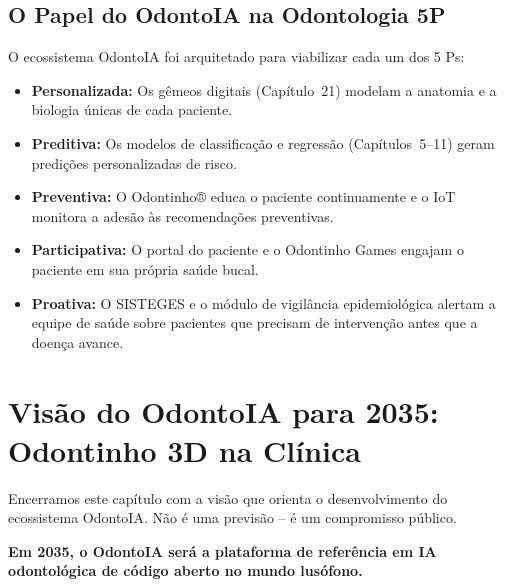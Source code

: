 \subsection{O Papel do OdontoIA na Odontologia 5P}

O ecossistema OdontoIA foi arquitetado para viabilizar cada um dos 5 Ps:

\begin{itemize}
  \item \textbf{Personalizada:} Os gêmeos digitais (Capítulo~21) modelam a
    anatomia e a biologia únicas de cada paciente.
  \item \textbf{Preditiva:} Os modelos de classificação e regressão
    (Capítulos~5--11) geram predições personalizadas de risco.
  \item \textbf{Preventiva:} O Odontinho® educa o paciente continuamente e o
    IoT monitora a adesão às recomendações preventivas.
  \item \textbf{Participativa:} O portal do paciente e o Odontinho Games
    engajam o paciente em sua própria saúde bucal.
  \item \textbf{Proativa:} O SISTEGES e o módulo de vigilância epidemiológica
    alertam a equipe de saúde sobre pacientes que precisam de intervenção antes
    que a doença avance.
\end{itemize}


\section{Visão do OdontoIA para 2035: Odontinho 3D na Clínica}
\label{sec:visao-2035}

\nivelzero

Encerramos este capítulo com a visão que orienta o desenvolvimento do
ecossistema OdontoIA. Não é uma previsão -- é um compromisso público.

\textbf{Em 2035, o OdontoIA será a plataforma de referência em IA odontológica
de código aberto no mundo lusófono.}

